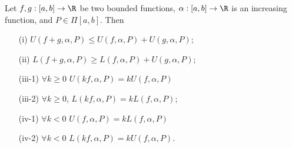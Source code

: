 \begin{lemma}[lemma 4]\label{lemma 4}
    Let \( f,g: [a,b] \to \R  \) be two bounded functions, \( \alpha: [a,b] \to \R  \) is an increasing function, and \( P \in \Pi[a,b] \). Then
    \begin{enumerate}
        \item[(i)] \( U(f + g,\alpha, P) \leq U(f,\alpha,P) + U(g,\alpha,P) \);
        \item[(ii)] \( L(f+g, \alpha, P) \geq L(f,\alpha,P) + U(g,\alpha, P) \);
        \item[(iii-1)] \( \forall k \geq 0  \) \( U(kf, \alpha, P) = k U(f,\alpha,P) \)
        \item[(iii-2)] \( \forall k \geq 0  \), \( L(kf,\alpha,P) = k L(f,\alpha,P) \);
        \item[(iv-1)] \( \forall k < 0  \) \( U(f,\alpha,P) = k L(f,\alpha,P) \)
        \item[(iv-2)] \( \forall k < 0  \) \( L(kf,\alpha, P) = k U(f,\alpha,P) \).
    \end{enumerate}
\end{lemma}

